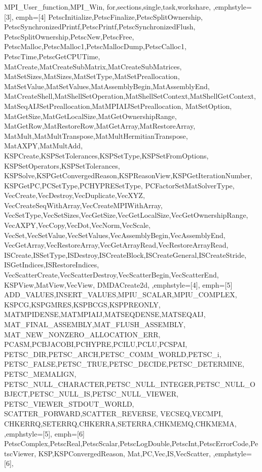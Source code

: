 {{    MPI_User_function,MPI_Win,
    for,sections,single,task,workshare,
  },emphstyle={[3]\color{yellow!30!brown}\bfseries},
  emph={[4] %
    PetscInitialize,PetscFinalize,PetscSplitOwnership,
    PetscSynchronizedPrintf,PetscPrintf,PetscSynchronizedFlush,
    PetscSplitOwnership,PetscNew,PetscFree,
    PetscMalloc,PetscMalloc1,PetscMallocDump,PetscCalloc1,
    PetscTime,PetscGetCPUTime,
    MatCreate,MatCreateSubMatrix,MatCreateSubMatrices,
    MatSetSizes,MatSizes,MatSetType,MatSetPreallocation,
    MatSetValue,MatSetValues,MatAssemblyBegin,MatAssemblyEnd,
    MatCreateShell,MatShellSetOperation,MatShellSetContext,MatShellGetContext,
    MatSeqAIJSetPreallocation,MatMPIAIJSetPreallocation,    
    MatSetOption,
    MatGetSize,MatGetLocalSize,MatGetOwnershipRange,
    MatGetRow,MatRestoreRow,MatGetArray,MatRestoreArray,
    MatMult,MatMultTranspose,MatMultHermitianTranspose,
    MatAXPY,MatMultAdd,
    KSPCreate,KSPSetTolerances,KSPSetType,KSPSetFromOptions,
    KSPSetOperators,KSPSetTolerances,
    KSPSolve,KSPGetConvergedReason,KSPReasonView,KSPGetIterationNumber,
    KSPGetPC,PCSetType,PCHYPRESetType,
    PCFactorSetMatSolverType,
    VecCreate,VecDestroy,VecDuplicate,VecXYZ,
    VecCreateSeqWithArray,VecCreateMPIWithArray,
    VecSetType,VecSetSizes,VecGetSize,VecGetLocalSize,VecGetOwnershipRange,
    VecAXPY,VecCopy,VecDot,VecNorm,VecScale,
    VecSet,VecSetValue,VecSetValues,VecAssemblyBegin,VecAssemblyEnd,
    VecGetArray,VecRestoreArray,VecGetArrayRead,VecRestoreArrayRead,
    ISCreate,ISSetType,ISDestroy,ISCreateBlock,ISCreateGeneral,ISCreateStride,
    ISGetIndices,ISRestoreIndices,
    VecScatterCreate,VecScatterDestroy,VecScatterBegin,VecScatterEnd,
    KSPView,MatView,VecView,
    DMDACreate2d,
  },emphstyle={[4]\color{red!40!black}\bfseries},
  emph={[5] %
    ADD_VALUES,INSERT_VALUES,MPIU_SCALAR,MPIU_COMPLEX,
    KSPCG,KSPGMRES,KSPBCGS,KSPPREONLY,
    MATMPIDENSE,MATMPIAIJ,MATSEQDENSE,MATSEQAIJ,
    MAT_FINAL_ASSEMBLY,MAT_FLUSH_ASSEMBLY,
    MAT_NEW_NONZERO_ALLOCATION_ERR,
    PCASM,PCBJACOBI,PCHYPRE,PCILU,PCLU,PCSPAI,
    PETSC_DIR,PETSC_ARCH,PETSC_COMM_WORLD,PETSC_i,
    PETSC_FALSE,PETSC_TRUE,PETSC_DECIDE,PETSC_DETERMINE,
    PETSC_MEMALIGN,
    PETSC_NULL_CHARACTER,PETSC_NULL_INTEGER,PETSC_NULL_OBJECT,PETSC_NULL_IS,PETSC_NULL_VIEWER,
    PETSC_VIEWER_STDOUT_WORLD,
    SCATTER_FORWARD,SCATTER_REVERSE,
    VECSEQ,VECMPI,
    CHKERRQ,SETERRQ,CHKERRA,SETERRA,CHKMEMQ,CHKMEMA,
  },emphstyle={[5]\color{green!60!black}},
  emph={[6] %
    PetscComplex,PetscReal,PetscScalar,PetscLogDouble,PetscInt,PetscErrorCode,PetscViewer,
    KSP,KSPConvergedReason,
    Mat,PC,Vec,IS,VecScatter,
  },emphstyle={[6]\bfseries\color{blue}},
}
